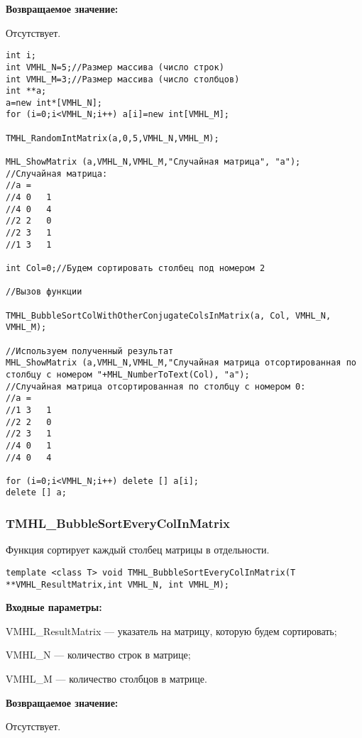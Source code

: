 \documentclass[a4paper,12pt]{article}
\begin{document}
\textbf{Возвращаемое значение:}

Отсутствует.


\begin{lstlisting}[label=code_use_TMHL_BubbleSortColWithOtherConjugateColsInMatrix,caption=Пример использования]
int i;
int VMHL_N=5;//Размер массива (число строк)
int VMHL_M=3;//Размер массива (число столбцов)
int **a;
a=new int*[VMHL_N];
for (i=0;i<VMHL_N;i++) a[i]=new int[VMHL_M];

TMHL_RandomIntMatrix(a,0,5,VMHL_N,VMHL_M);

MHL_ShowMatrix (a,VMHL_N,VMHL_M,"Случайная матрица", "a");
//Случайная матрица:
//a =
//4	0	1
//4	0	4
//2	2	0
//2	3	1
//1	3	1

int Col=0;//Будем сортировать столбец под номером 2

//Вызов функции

TMHL_BubbleSortColWithOtherConjugateColsInMatrix(a, Col, VMHL_N, VMHL_M);

//Используем полученный результат
MHL_ShowMatrix (a,VMHL_N,VMHL_M,"Случайная матрица отсортированная по столбцу с номером "+MHL_NumberToText(Col), "a");
//Случайная матрица отсортированная по столбцу с номером 0:
//a =
//1	3	1
//2	2	0
//2	3	1
//4	0	1
//4	0	4

for (i=0;i<VMHL_N;i++) delete [] a[i];
delete [] a;
\end{lstlisting}

\subsubsection{TMHL\_BubbleSortEveryColInMatrix}\label{TMHL_BubbleSortEveryColInMatrix}

Функция сортирует каждый столбец матрицы в отдельности.


\begin{lstlisting}[label=code_syntax_TMHL_BubbleSortEveryColInMatrix,caption=Синтаксис]
template <class T> void TMHL_BubbleSortEveryColInMatrix(T **VMHL_ResultMatrix,int VMHL_N, int VMHL_M);
\end{lstlisting}

\textbf{Входные параметры:}
 
VMHL\_ResultMatrix --- указатель на матрицу, которую будем сортировать;
 
VMHL\_N --- количество строк в матрице;
 
VMHL\_M --- количество столбцов в матрице.

\textbf{Возвращаемое значение:}

Отсутствует.
\end{document}
